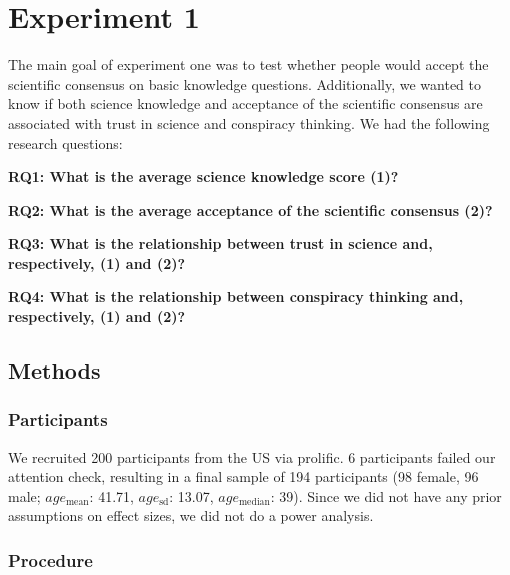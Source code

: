 \documentclass[
  doc,floatsintext]{apa6}
\begin{document}
\hypertarget{experiment-1}{%
\section{Experiment 1}\label{experiment-1}}

The main goal of experiment one was to test whether people would accept the scientific consensus on basic knowledge questions. Additionally, we wanted to know if both science knowledge and acceptance of the scientific consensus are associated with trust in science and conspiracy thinking. We had the following research questions:

\textbf{RQ1: What is the average science knowledge score (1)?}

\textbf{RQ2: What is the average acceptance of the scientific consensus (2)?}

\textbf{RQ3: What is the relationship between trust in science and, respectively, (1) and (2)?}

\textbf{RQ4: What is the relationship between conspiracy thinking and, respectively, (1) and (2)?}

\hypertarget{methods}{%
\subsection{Methods}\label{methods}}

\hypertarget{participants}{%
\subsubsection{Participants}\label{participants}}

We recruited 200 participants from the US via prolific. 6 participants failed our attention check, resulting in a final sample of 194 participants (98 female, 96 male; \(age_\text{mean}\): 41.71, \(age_\text{sd}\): 13.07, \(age_\text{median}\): 39). Since we did not have any prior assumptions on effect sizes, we did not do a power analysis.

\hypertarget{procedure}{%
\subsubsection{Procedure}\label{procedure}}
\end{document}

